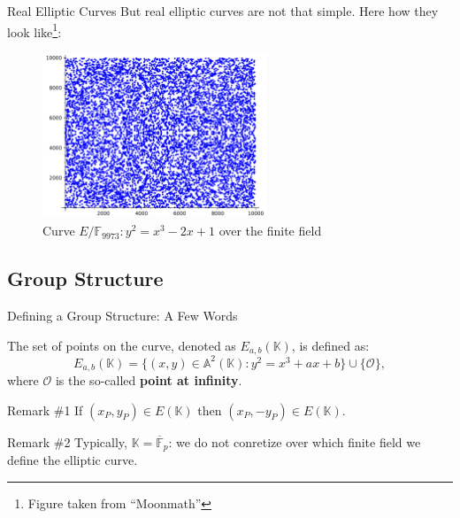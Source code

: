 \documentclass{zkdl-presentation-template}
\begin{document}
    \begin{frame}{Real Elliptic Curves}
        But real elliptic curves are not that simple. Here how they look like\footnote{Figure taken from ``Moonmath''}:
        \begin{figure}
            \centering
            \includegraphics[width=0.6\textwidth]{images/lecture_3/ec_illustration_3.png}
            \caption{Curve $E/\mathbb{F}_{9973}: y^2 = x^3-2x+1$ over the finite field}
            \label{fig:ec_3}
        \end{figure}
    \end{frame}

    \subsection{Group Structure}

    \begin{frame}{Defining a Group Structure: A Few Words}
        \begin{definition}
            The set of points on the curve, denoted as $E_{a,b}(\mathbb{K})$, is defined as:
            \begin{equation*}
                E_{a,b}(\mathbb{K}) = \{(x,y) \in \mathbb{A}^2(\mathbb{K}): y^2=x^3+ax+b\} \cup \{\mathcal{O}\},
            \end{equation*}
            where $\mathcal{O}$ is the so-called \textbf{point at infinity}.
        \end{definition}

        \begin{block}{Remark \#1}
            If $(x_P,y_P) \in E(\mathbb{K})$ then $(x_P,-y_P) \in E(\mathbb{K})$.
        \end{block}

        \begin{block}{Remark \#2}
            Typically, $\mathbb{K} = \overline{\mathbb{F}}_p$: we do not conretize over which finite field we define the elliptic curve.
        \end{block}
    \end{frame}
\end{document}
